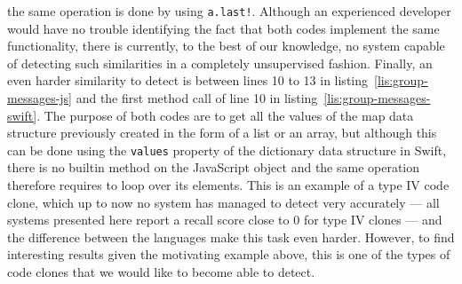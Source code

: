 the same operation is done by using \lstinline{a.last!}. Although an experienced
developer would have no trouble identifying the fact that both codes implement
the same functionality, there is currently, to the best of our knowledge, no
system capable of detecting such similarities in a completely unsupervised
fashion. Finally, an even harder similarity to detect is between lines 10 to 13
in listing~\ref{lis:group-messages-js} and the first method call of line 10 in
listing~\ref{lis:group-messages-swift}. The purpose of both codes are to get all
the values of the map data structure previously created in the form of a list or
an array, but although this can be done using the \lstinline{values} property of
the dictionary data structure in Swift, there is no builtin method on the
JavaScript object and the same operation therefore requires to loop over its
elements. This is an example of a type IV code clone, which up to now no system
has managed to detect very accurately --- all systems presented here report a
recall score close to $0$ for type IV clones --- and the difference between the
languages make this task even harder. However, to find interesting results
given the motivating example above, this is one of the types of code clones that
we would like to become able to detect.
